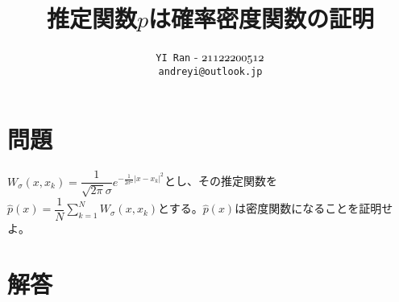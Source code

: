 \documentclass[dvipdfmx,a4paper,12pt]{jarticle}
\title{\vspace{-3cm}\textbf{\Large 推定関数$\hat{p}$は確率密度関数の証明}}  %
\author{\texttt{YI Ran} - $\mathnormal{21122200512}$\\ \texttt{andreyi@outlook.jp}}  %
\date{}  %
\theoremstyle{mystyle}
\begin{document}
\maketitle
\section*{\textbf{問題}}

\noindent
$W_{\sigma}(x,x_k)=\dfrac{1}{\sqrt{2\pi}\sigma} e^{-\frac{1}{2\sigma^2}|x-x_k|^2}  $とし、その推定関数を$\hat{p}(x)=\displaystyle\dfrac{1}{N}\sum_{k=1}^{N}W_{\sigma}(x,x_k)$とする。$\hat{p}(x)$は密度関数になることを証明せよ。

\section*{\textbf{解答}}
\end{document}
